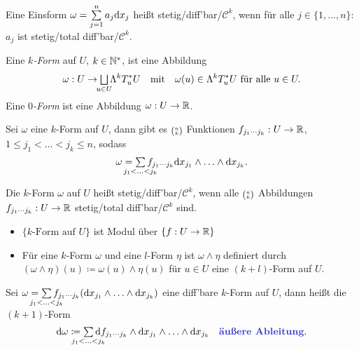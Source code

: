 \documentclass{cheat-sheet}
\newcommand{\Cont}{\mathcal{C}} %
\theoremstyle{definition}
\let\myBinom\binom
\renewcommand{\binom}[2]{\mathsmaller{\myBinom{#1}{#2}}}
\begin{document}
\begin{defn}
  Eine Einsform $\omega = \sum_{j=1}^n a_j \d x_j$ heißt stetig/diff'bar/$\Cont^k$, wenn für alle $j \in \{ 1, \ldots, n \}$: $a_j$ ist stetig/total diff'bar/$\Cont^k$.
\end{defn}
\fi


\begin{defn}
  Eine \emph{$k$-Form} auf $U$, $k \in \mathbb{N}^*$, ist eine Abbildung
  \[ \omega : U \to \bigsqcup_{\mathclap{u \in U}} \Lambda^k T_u^* U \quad \text{mit} \quad \omega(u) \in \Lambda^k T_u^* U \text{ für alle } u \in U. \]
  Eine \emph{$0$-Form} ist eine Abbildung $\omega : U \to \mathbb{R}$.
\end{defn}


\begin{beobachtung}
  Sei $\omega$ eine $k$-Form auf $U$, dann gibt es $\binom{n}{k}$ Funktionen $f_{j_1 \cdots j_k} : U \to \mathbb{R}$, $1 \leq j_1 < \ldots < j_k \leq n$, sodass
  \[ \omega = \sum_{\mathclap{j_1 < \ldots < j_k}} f_{j_1 \cdots j_k} \d x_{j_1} \wedge \ldots \wedge \d x_{j_k}. \]
\end{beobachtung}

\begin{defn}
  Die $k$-Form $\omega$ auf $U$ heißt stetig/diff'bar/$\Cont^k$, wenn alle $\binom{n}{k}$ Abbildungen $f_{j_1 \cdots j_k} : U \to \mathbb{R}$ stetig/total diff'bar/$\Cont^k$ sind.
\end{defn}

\begin{beobachtung}
  \begin{itemize}
    \item $\{ k\text{-Form auf } U \}$ ist Modul über $\{ f : U \to \mathbb{R} \}$
    \item Für eine $k$-Form $\omega$ und eine $l$-Form $\eta$ ist $\omega \wedge \eta$ definiert durch $(\omega \wedge \eta)(u) \coloneqq \omega(u) \wedge \eta(u)$ für $u \in U$ eine $(k{+}l)$-Form auf $U$.
  \end{itemize}
\end{beobachtung}

\begin{defn}
  Sei $\omega = \sum_{\mathclap{j_1 < \ldots < j_k}} f_{j_1 \cdots j_k} (\d x_{j_1} \wedge \ldots \wedge \d x_{j_k})$ eine diff'bare $k$-Form auf $U$, dann heißt die $(k{+}1)$-Form
  \[ \d \omega \coloneqq \sum_{\mathclap{j_1 < \ldots < j_k}} \d f_{j_1 \cdots j_k} \wedge \d x_{j_1} \wedge \ldots \wedge \d x_{j_k} \quad \text{\emph{äußere Ableitung}}. \]
\end{defn}
\end{document}
